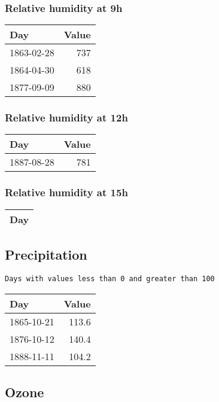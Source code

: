 \documentclass[]{article}
\begin{document}
\subsubsection{Relative humidity at 9h}\label{relative-humidity-at-9h-1}

\begin{longtable}[]{@{}lr@{}}
\toprule
Day & Value\tabularnewline
\midrule
\endhead
1863-02-28 & 737\tabularnewline
1864-04-30 & 618\tabularnewline
1877-09-09 & 880\tabularnewline
\bottomrule
\end{longtable}

\subsubsection{Relative humidity at 12h}\label{relative-humidity-at-12h}

\begin{longtable}[]{@{}lr@{}}
\toprule
Day & Value\tabularnewline
\midrule
\endhead
1887-08-28 & 781\tabularnewline
\bottomrule
\end{longtable}

\subsubsection{Relative humidity at 15h}\label{relative-humidity-at-15h}

\begin{longtable}[]{@{}l@{}}
\toprule
Day\tabularnewline
\midrule
\endhead
\bottomrule
\end{longtable}

\subsection{Precipitation}\label{precipitation-1}

\begin{verbatim}
Days with values less than 0 and greater than 100
\end{verbatim}

\begin{longtable}[]{@{}lr@{}}
\toprule
Day & Value\tabularnewline
\midrule
\endhead
1865-10-21 & 113.6\tabularnewline
1876-10-12 & 140.4\tabularnewline
1888-11-11 & 104.2\tabularnewline
\bottomrule
\end{longtable}

\subsection{Ozone}\label{ozone-1}
\end{document}
